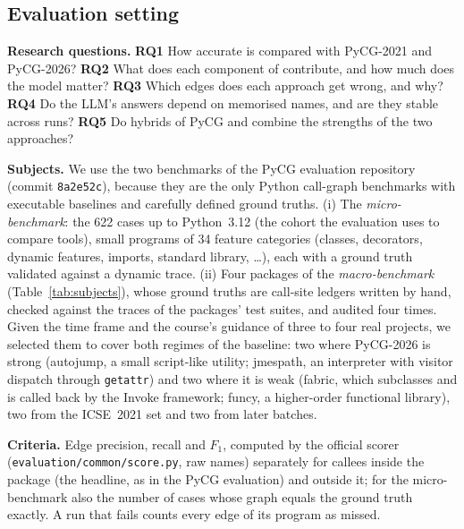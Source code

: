 \subsection{Evaluation setting}
\label{sec:setup}

\textbf{Research questions.}
\textbf{RQ1} How accurate is \nscg compared with PyCG-2021 and PyCG-2026?
\textbf{RQ2} What does each component of \nscg contribute, and how much does the
model matter?
\textbf{RQ3} Which edges does each approach get wrong, and why?
\textbf{RQ4} Do the LLM's answers depend on memorised names, and are they stable
across runs?
\textbf{RQ5} Do hybrids of PyCG and \nscg combine the strengths of the two approaches?

\textbf{Subjects.} We use the two benchmarks of the PyCG evaluation repository~\cite{pycgeval2026}
(commit \texttt{8a2e52c}), because they are the only Python call-graph
benchmarks with executable baselines and carefully defined ground truths.
(i) The \emph{micro-benchmark}: the 622 cases up to Python~3.12 (the cohort the
evaluation uses to compare tools), small programs of 34 feature categories
(classes, decorators, dynamic features, imports, standard library, \dots), each
with a ground truth validated against a dynamic trace. (ii) Four packages of the
\emph{macro-benchmark} (Table~\ref{tab:subjects}), whose ground truths are
call-site ledgers written by hand, checked against the traces of the packages'
test suites, and audited four times. Given the time frame and the course's
guidance of three to four real projects, we selected them to cover both regimes
of the baseline: two where PyCG-2026 is strong (autojump, a small script-like
utility; jmespath, an interpreter with visitor dispatch through
\texttt{getattr}) and two where it is weak (fabric, which subclasses and is
called back by the Invoke framework; funcy, a higher-order functional library),
two from the ICSE~2021 set and two from later batches.

\begin{table}[t]
  \caption{The four packages (sources at the pinned commits of the benchmark).
  Edges in/out: ground-truth edges inside / outside the package. Sites: call
  sites that the \nscg front-end finds and the LLM then decides.}
  \label{tab:subjects}
  \small
  \setlength{\tabcolsep}{3.2pt}
  
\end{table}

\textbf{Criteria.} Edge precision, recall and $F_1$, computed by the official
scorer (\texttt{evaluation/common/score.py}, raw names) separately for callees
inside the package (the headline, as in the PyCG evaluation) and outside it; for
the micro-benchmark also the number of cases whose graph equals the ground truth
exactly. A run that fails counts every edge of its program as missed.

